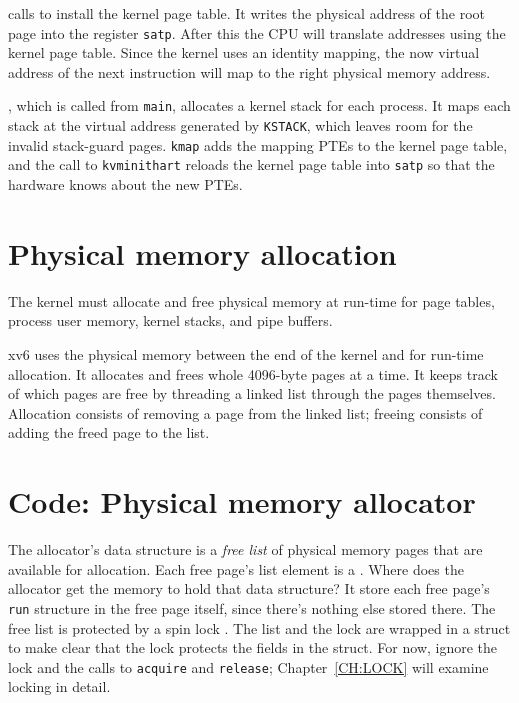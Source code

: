 calls
to install the kernel page table.
It writes the physical address of the root page
into the register
\texttt{satp}.
After this the CPU will translate addresses using the kernel
page table.  Since the kernel uses an identity mapping, the now
virtual address of the next instruction will map to the right physical
memory address.

 , which is
called from \lstinline{main}, allocates a kernel stack for each
process. It maps each stack at the virtual address generated by
\lstinline{KSTACK}, which leaves room for the invalid stack-guard
pages. \lstinline{kmap} adds the mapping PTEs to the kernel page
table, and the call to \lstinline{kvminithart} reloads the kernel page
table into \texttt{satp} so that the hardware knows about the new
PTEs.

\section{Physical memory allocation}

The kernel must allocate and free physical memory at run-time for
page tables,
process user memory,
kernel stacks,
and pipe buffers.

xv6 uses the physical memory between the end of the kernel and
for run-time allocation. It allocates and frees whole 4096-byte pages
at a time. It keeps track of which pages are free by threading a
linked list through the pages themselves. Allocation consists of
removing a page from the linked list; freeing consists of adding the
freed page to the list.
\section{Code: Physical memory allocator}

The allocator's data structure is a
\textit{free list}
of physical memory pages that are available
for allocation.
Each free page's list element is a
.
Where does the allocator get the memory
to hold that data structure?
It store each free page's
\lstinline{run}
structure in the free page itself,
since there's nothing else stored there.
The free list is
protected by a spin lock
.
The list and the lock are wrapped in a struct
to make clear that the lock protects the fields
in the struct.
For now, ignore the lock and the calls to
\lstinline{acquire}
and
\lstinline{release};
Chapter~\ref{CH:LOCK} will examine
locking in detail.

